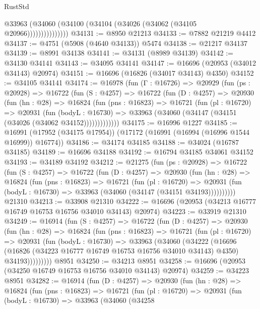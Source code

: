 \begin{lexlean}{RustStd}
\begin{coremodule}
                    @33963 (@34060 (@34100 (@34104 (@34026 (@34062 (@34105 @20966)))))))))))))))
@34131 := @8950 @21213
@34133 := @7882 @21219 @4412
@34137 := @4751 (@5908 (@4640 @34133)) @5474
@34138 := @21217 @34137
@34139 := @8991 @34138
@34141 := @34131 (@8989 @34139)
@34142 := @34130 @34141
@34143 := @34095 @34141
@34147 := @16696 (@20953 (@34012 @34143) @20974)
@34151 := @16696 (@16826 (@34017 @34143) @4350)
@34152 := @34105 @34141
@34174 := @16978
    (fun (Γ : @16726) =>
    @20929
      (fun (ps : @20928) =>
      @16722
        (fun (S : @4257) =>
        @16722
          (fun (D : @4257) =>
          @20930
            (fun (hn : @28) =>
            @16824
              (fun (pns : @16823) =>
              @16721
                (fun (pl : @16720) =>
                @20931
                  (fun (bodyL : @16730) =>
                  @33963 (@34060 (@34147 (@34151 (@34026 (@34062 @34152)))))))))))))
@34175 := @16996 @1227
@34185 := @16991 (@17952 (@34175 @17954)) (@17172 (@16991 (@16994 (@16996 @1544 @16999)) @16774))
@34186 := @34174 @34185
@34188 := @34024 (@16787 @34185)
@34189 := @16696 @34188
@34192 := @16794 @34185 @34061 @34152
@34193 := @34189 @34192
@34212 := @21275
    (fun (ps : @20928) =>
    @16722
      (fun (S : @4257) =>
      @16722
        (fun (D : @4257) =>
        @20930
          (fun (hn : @28) =>
          @16824
            (fun (pns : @16823) =>
            @16721
              (fun (pl : @16720) =>
              @20931 (fun (bodyL : @16730) => @33963 (@34060 (@34147 (@34151 @34193))))))))))
    @21310
@34213 := @33908 @21310
@34222 := @16696 (@20953 (@34213 @16777 @16749 @16753 @16756 @34010 @34143) @20974)
@34223 := @33919 @21310
@34249 := @16914
    (fun (S : @4257) =>
    @16722
      (fun (D : @4257) =>
      @20930
        (fun (hn : @28) =>
        @16824
          (fun (pns : @16823) =>
          @16721
            (fun (pl : @16720) =>
            @20931
              (fun (bodyL : @16730) =>
              @33963
                (@34060
                  (@34222
                    (@16696
                      (@16826 (@34223 @16777 @16749 @16753 @16756 @34010 @34143) @4350)
                      @34193)))))))))
    @8951
@34250 := @34213 @8951
@34258 := @16696 (@20953 (@34250 @16749 @16753 @16756 @34010 @34143) @20974)
@34259 := @34223 @8951
@34282 := @16914
    (fun (D : @4257) =>
    @20930
      (fun (hn : @28) =>
      @16824
        (fun (pns : @16823) =>
        @16721
          (fun (pl : @16720) =>
          @20931
            (fun (bodyL : @16730) =>
            @33963
              (@34060
                (@34258

\end{coremodule}
\end{lexlean}
